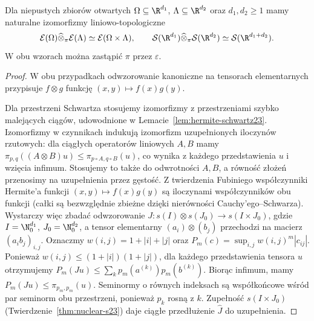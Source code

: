 \begin{twierdzenie}
\label{thm:smooth-schwartz-tensor24}
Dla niepustych zbiorów otwartych $\Omega\subseteq\R^{d_1}$,
$\Lambda\subseteq\R^{d_2}$ oraz $d_1,d_2\ge1$ mamy
naturalne izomorfizmy liniowo-topologiczne
\[
 \mathcal E(\Omega)\widehat\otimes_\pi\mathcal E(\Lambda)
 \simeq \mathcal E(\Omega\times\Lambda),\qquad
 \mathcal S(\R^{d_1})\widehat\otimes_\pi\mathcal S(\R^{d_2})
 \simeq \mathcal S(\R^{d_1+d_2}).
\]
W obu wzorach można zastąpić $\pi$ przez $\varepsilon$.
\end{twierdzenie}
\begin{proof}
W obu przypadkach odwzorowanie kanoniczne na tensorach
elementarnych przypisuje $f\otimes g$ funkcję
$(x,y)\mapsto f(x)g(y)$.

Dla przestrzeni Schwartza stosujemy izomorfizmy z
przestrzeniami szybko malejących ciągów, udowodnione
w Lemacie~\ref{lem:hermite-schwartz23}.
Izomorfizmy w czynnikach indukują izomorfizm
uzupełnionych iloczynów rzutowych: dla ciągłych
operatorów liniowych $A,B$ mamy
$\pi_{p,q}((A\otimes B)u)\le\pi_{p\circ A,q\circ B}(u)$,
co wynika z każdego przedstawienia $u$ i wzięcia
infimum. Stosujemy to także do odwrotności $A,B$,
a równość złożeń przenosimy na uzupełnienia przez gęstość.
Z twierdzenia Fubiniego współczynniki Hermite'a
funkcji $(x,y)\mapsto f(x)g(y)$ są iloczynami
współczynników obu funkcji (całki są bezwzględnie
zbieżne dzięki nierówności Cauchy'ego--Schwarza).
Wystarczy więc zbadać odwzorowanie
$J:s(I)\otimes s(J_0)\to s(I\times J_0)$,
gdzie $I=\N_0^{d_1}$, $J_0=\N_0^{d_2}$,
a tensor elementarny $(a_i)\otimes(b_j)$
przechodzi na macierz $(a_i b_j)_{i,j}$.
Oznaczmy $w(i,j)=1+|i|+|j|$ oraz
$P_m(c)=\sup_{i,j}w(i,j)^m|c_{ij}|$.
Ponieważ $w(i,j)\le(1+|i|)(1+|j|)$,
dla każdego przedstawienia tensora $u$ otrzymujemy
$P_m(Ju)\le\sum_k p_m(a^{(k)})p_m(b^{(k)})$.
Biorąc infimum, mamy
$P_m(Ju)\le\pi_{p_m,p_m}(u)$.
Seminormy o równych indeksach są współkońcowe
wśród par seminorm obu przestrzeni, ponieważ
$p_k$ rosną z $k$. Zupełność $s(I\times J_0)$
(Twierdzenie~\ref{thm:nuclear-s23}) daje ciągłe
przedłużenie $\widehat J$ do uzupełnienia.


\end{proof}
